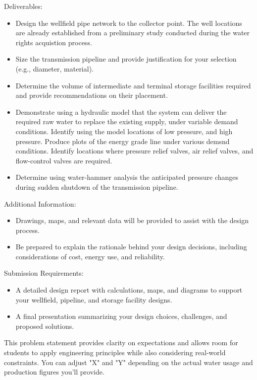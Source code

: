 \documentclass[12pt]{article}
\begin{document}
Deliverables:

\begin{itemize}
\item Design the wellfield pipe network to the collector point. The well locations are already established from a preliminary study conducted during the water rights acquistion process.
\item Size the transmission pipeline and provide justification for your selection (e.g., diameter, material).
\item Determine the volume of intermediate and terminal storage facilities required and provide recommendations on their placement.
\item Demonstrate using a hydraulic model that the system can deliver the required raw water to replace the existing supply, under variable demand conditions.  Identify using the model locations of low pressure, and high pressure. Produce plots of the energy grade line under various demsnd conditions.  Identify locations where pressure relief valves, air relief valves, and flow-control valves are required.
\item Determine using water-hammer analysis the anticipated pressure changes during sudden shutdown of the transmission pipeline.
\end{itemize}


Additional Information:
\begin{itemize}
\item Drawings, maps, and relevant data will be provided to assist with the design process.
\item Be prepared to explain the rationale behind your design decisions, including considerations of cost, energy use, and reliability.
\end{itemize}
Submission Requirements:
\begin{itemize}
\item A detailed design report with calculations, maps, and diagrams to support your wellfield, pipeline, and storage facility designs.
\item A final presentation summarizing your design choices, challenges, and proposed solutions.
\end{itemize}
This problem statement provides clarity on expectations and allows room for students to apply engineering principles while also considering real-world constraints. You can adjust "X" and "Y" depending on the actual water usage and production figures you'll provide.
\end{document}
